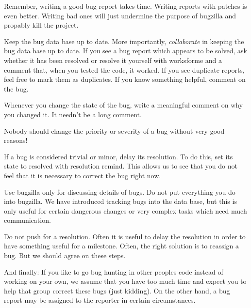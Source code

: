 \documentclass[11pt,handout]{handout}
\begin{document}
Remember, writing a good bug report takes time.  Writing reports with
patches is even better.  Writing bad ones will just undermine the
purpose of bugzilla and propably kill the project.

Keep the bug data base up to date.  More importantly, \emph{collaborate}
in keeping the bug data base up to date.  If you see a bug report which
appears to be solved, ask whether it has been resolved or resolve it
yourself with worksforme and a comment that, when you tested the code,
it worked.  If you see duplicate reports, feel free to mark them as
duplicates.  If you know something helpful, comment on the bug.

Whenever you change the state of the bug, write a meaningful comment
on why you changed it.  It needn't be a long comment.

Nobody should change the priority or severity of a bug without very
good reasons!

If a bug is considered trivial or minor, delay its resolution.  To do
this, set its state to resolved with resolution remind.  This allows
us to see that you do not feel that it is necessary to correct the bug
right now.

Use bugzilla only for discussing details of bugs.  Do not put everything
you do into bugzilla.  We have introduced tracking bugs into the
data base, but this is only useful for certain dangerous changes or very
complex tasks which need much communication.

Do not push for a resolution.  Often it is useful to delay the resolution
in order to have something useful for a milestone.  Often, the right
solution is to reassign a bug.  But we should agree on these steps.

And finally: If you like to go bug hunting in other peoples code instead
of working on your own, we assume that you have too much time and expect
you to help that group correct these bugs (just kidding).  On the other
hand, a bug report may be assigned to the reporter in certain
circumstances.
\end{document}
